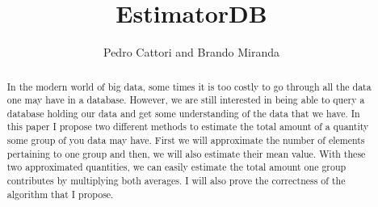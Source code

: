 \documentclass[a4paper]{article}
\title{EstimatorDB}
\author{Pedro Cattori and Brando Miranda}
\begin{document}
\maketitle

\begin{abstract}
In the modern world of big data, some times it is too costly to go through all the data one may have in a database.
However, we are still interested in being able to query a database holding our data and get some understanding of the data that we have.
In this paper I propose two different methods to estimate the total amount of a quantity some group of you data may have.
First we will approximate the number of elements pertaining to one group and then, we will also estimate their mean value.
With these two approximated quantities, we can easily estimate the total amount one group contributes by multiplying both averages.
I will also prove the correctness of the algorithm that I propose.
\end{abstract}
\end{document}
